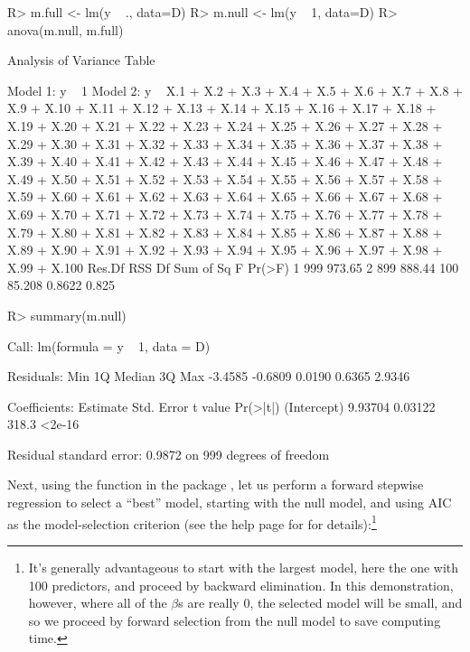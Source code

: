 \documentclass[
]{jss}
\begin{document}
\begin{CodeChunk}
\begin{CodeInput}
R> m.full <- lm(y ~ ., data=D)
R> m.null <- lm(y ~ 1, data=D)
R> anova(m.null, m.full)
\end{CodeInput}
\begin{CodeOutput}
Analysis of Variance Table

Model 1: y ~ 1
Model 2: y ~ X.1 + X.2 + X.3 + X.4 + X.5 + X.6 + X.7 + X.8 + X.9 + X.10 + 
    X.11 + X.12 + X.13 + X.14 + X.15 + X.16 + X.17 + X.18 + X.19 + 
    X.20 + X.21 + X.22 + X.23 + X.24 + X.25 + X.26 + X.27 + X.28 + 
    X.29 + X.30 + X.31 + X.32 + X.33 + X.34 + X.35 + X.36 + X.37 + 
    X.38 + X.39 + X.40 + X.41 + X.42 + X.43 + X.44 + X.45 + X.46 + 
    X.47 + X.48 + X.49 + X.50 + X.51 + X.52 + X.53 + X.54 + X.55 + 
    X.56 + X.57 + X.58 + X.59 + X.60 + X.61 + X.62 + X.63 + X.64 + 
    X.65 + X.66 + X.67 + X.68 + X.69 + X.70 + X.71 + X.72 + X.73 + 
    X.74 + X.75 + X.76 + X.77 + X.78 + X.79 + X.80 + X.81 + X.82 + 
    X.83 + X.84 + X.85 + X.86 + X.87 + X.88 + X.89 + X.90 + X.91 + 
    X.92 + X.93 + X.94 + X.95 + X.96 + X.97 + X.98 + X.99 + X.100
  Res.Df    RSS  Df Sum of Sq      F Pr(>F)
1    999 973.65                            
2    899 888.44 100    85.208 0.8622  0.825
\end{CodeOutput}
\begin{CodeInput}
R> summary(m.null)
\end{CodeInput}
\begin{CodeOutput}

Call:
lm(formula = y ~ 1, data = D)

Residuals:
    Min      1Q  Median      3Q     Max 
-3.4585 -0.6809  0.0190  0.6365  2.9346 

Coefficients:
            Estimate Std. Error t value Pr(>|t|)
(Intercept)  9.93704    0.03122   318.3   <2e-16

Residual standard error: 0.9872 on 999 degrees of freedom
\end{CodeOutput}
\end{CodeChunk}

Next, using the  function in the  package
\citep{VenablesRipley:2002}, let us perform a forward stepwise
regression to select a ``best'' model, starting with the null model, and
using AIC as the model-selection criterion (see the help page for
 for details):\footnote{It's generally advantageous to
  start with the largest model, here the one with 100 predictors, and
  proceed by backward elimination. In this demonstration, however, where
  all of the \(\beta\)s are really 0, the selected model will be small,
  and so we proceed by forward selection from the null model to save
  computing time.}
\end{document}
